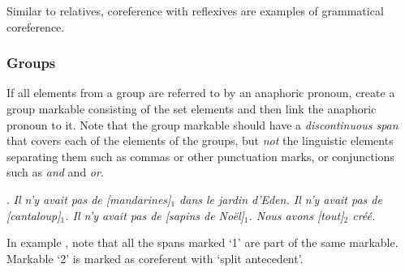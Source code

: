 \documentclass[a4paper]{article}
\begin{document}

Similar to relatives, coreference with reflexives are examples of grammatical
coreference. %


\subsubsection{\label{sec:groups}Groups}

If all elements from a group are referred to by an anaphoric pronoun, create a
group markable consisting of the set elements and then link the anaphoric
pronoun to it. Note that the group markable should have a \emph{discontinuous
span} that covers each of the elements of the groups, but \emph{not} the
linguistic elements separating them such as commas or other punctuation marks,
or conjunctions such as \textsl{and} and \textsl{or}.

\ex. 
\textsl{Il n'y avait pas de [mandarines]$_1$ dans le jardin d'Eden. Il n'y
avait pas de [cantaloup]$_1$. Il n'y avait pas de [sapins de Noël]$_1$. Nous
avons [tout]$_2$ créé.}

In example \Last, note that all the spans marked `1' are part of the same
markable. Markable `2' is marked as coreferent with `split antecedent'.


\end{document}
